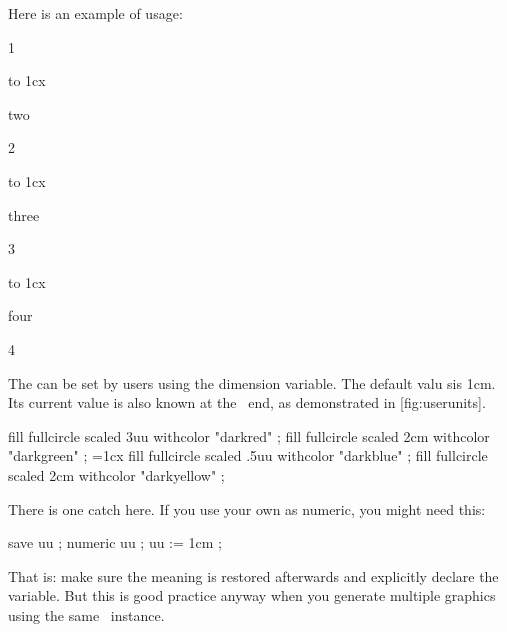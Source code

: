 Here is an example of usage:

\startbuffer
{}   {1}
    { to 1cx{\strut two}}   {2}
    { to 1cx{\strut three}} {3}
    { to 1cx{\strut four}}  {4}
\stopcombination
\stopbuffer


\startplacefigure[title=A map of available units,reference=fig:unitsmap]
    \framed[offset=1ex]{\showunitsmap}
\stopplacefigure

\typebuffer[option=TEX]

\startlinecorrection
\getbuffer
\stoplinecorrection

The  can be set by users using the \type {\uunit} dimension variable.
The default valu sis 1cm. Its current value is also known at the \METAPOST\ end,
as demonstrated in  [fig:userunits].

\startbuffer
\startcombination[nx=2,ny=1]
    \startcontent
        \uunit=1cm
        \framed[offset=1uu]
            \bgroup
                \startMPcode
                    fill fullcircle scaled 3uu withcolor "darkred"   ;
                    fill fullcircle scaled 2cm withcolor "darkgreen" ;
                \stopMPcode
            \egroup
    \stopcontent
    \startcaption
        \type {\uunit = 1cm}
    \stopcaption
    \startcontent
        \uunit=1cx
        \framed[offset=.1uu]
            \bgroup
                \startMPcode
                    fill fullcircle scaled .5uu withcolor "darkblue"   ;
                    fill fullcircle scaled  2cm withcolor "darkyellow" ;
                \stopMPcode
            \egroup
    \stopcontent
    \startcaption
    \stopcaption
\stopcombination
\stopbuffer


\typebuffer[option=TEX]

There is one catch here. If you use your own  as numeric, you might
need this:

\starttyping[option=MP]
save uu ; numeric uu ; uu := 1cm ;
\stoptyping

That is: make sure the meaning is restored afterwards and explicitly declare the
variable. But this is good practice anyway when you generate multiple graphics
using the same \METAPOST\ instance.

